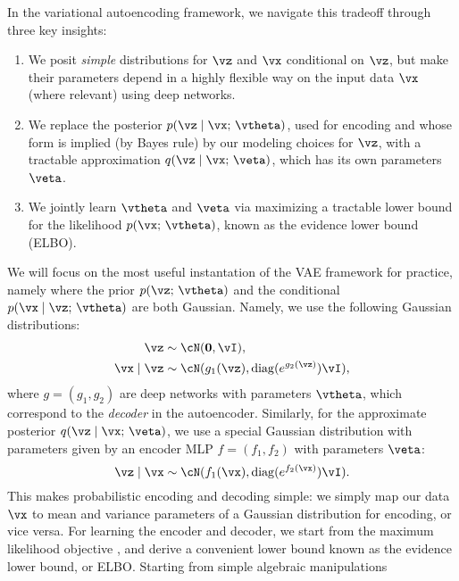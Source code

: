 \documentclass[\toplevelprefix/book-main.tex]{subfiles}
\begin{document}
In the variational autoencoding framework, we navigate this tradeoff through
three key insights:
\begin{enumerate}
\item We posit \textit{simple} distributions for $\vz$ and $\vx$ conditional
  on $\vz$, but make their parameters depend in a highly flexible way on the
  input data $\vx$ (where relevant) using deep networks.
\item We replace the posterior $p(\vz \mid \vx;\, \vtheta)$, used for encoding
  and whose form is implied (by Bayes rule) by our modeling choices for $\vz$,
  with a tractable approximation $q(\vz \mid \vx;\, \veta)$, which has its own
  parameters $\veta$.
\item We jointly learn $\vtheta$ and $\veta$ via maximizing a tractable lower
  bound for the likelihood $p(\vx ;\, \vtheta)$, known as the evidence lower
  bound (ELBO).
\end{enumerate}
We will focus on the most useful instantation of the VAE framework
for practice, namely
where the prior $p(\vz ;\, \vtheta)$ and the conditional $p(\vx \mid \vz;\,
\vtheta)$ are both Gaussian. Namely, we use the following Gaussian
distributions:
\begin{align*}
\vz &\sim \cN(\Zero, \vI), \\
\vx \mid \vz &\sim \cN(g_1(\vz), \diag(e^{g_2(\vz)}) \vI),
\end{align*}
where $g = (g_1, g_2)$ are deep networks with parameters $\vtheta$, which
correspond to the \textit{decoder} in the autoencoder.
Similarly, for the approximate posterior $q(\vz \mid \vx;\, \veta)$, we use
a special Gaussian distribution with parameters given by an encoder
MLP $f = (f_1, f_2)$ with parameters $\veta$:
\begin{equation*}
\vz \mid \vx \sim \cN(f_1(\vx), \diag(e^{f_2(\vx)}) \vI).
\end{equation*}
This makes probabilistic encoding and decoding simple: we simply map our data
$\vx$ to mean and variance parameters of a Gaussian distribution for
encoding, or vice versa.
For learning the encoder and decoder, we start from the maximum likelihood
objective , and derive a convenient lower bound known as the
evidence lower bound, or ELBO. Starting from simple algebraic manipulations
\end{document}

